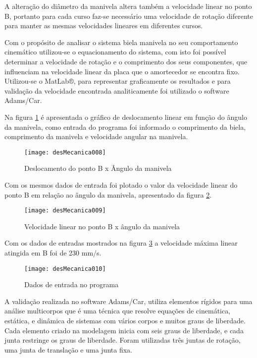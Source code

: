 		A alteração do diâmetro da manivela altera também a velocidade linear no ponto B, portanto para cada curso faz-se necessário uma velocidade de rotação diferente para manter as mesmas velocidades lineares em diferentes cursos.  

		Com o propósito de analisar o sistema biela manivela no seu comportamento cinemático utilizou-se o equacionamento do sistema, com isto foi possível determinar a velocidade de rotação e o comprimento dos seus componentes, que influenciam na velocidade linear da placa que o amortecedor se encontra fixo. Utilizou-se o MatLab®, para representar graficamente os resultados e para validação da velocidade encontrada analiticamente foi utilizado o software Adams/Car.

		Na figura \ref{desMecanica008} é apresentada o gráfico de deslocamento linear em função do ângulo da manivela, como entrada do programa foi informado o comprimento da biela, comprimento da manivela e velocidade angular na manivela.

		\begin{figure}[h]
			\centering
			\texttt{[image: desMecanica008]}
			\caption{Deslocamento do ponto B x Ângulo da manivela}
			\label{desMecanica008}
		\end{figure}

		Com os mesmos dados de entrada foi plotado o valor da velocidade linear do ponto B em relação ao ângulo da manivela, apresentado da figura \ref{desMecanica009}.

		\begin{figure}[h]
			\centering
			\texttt{[image: desMecanica009]}
			\caption{Velocidade linear no ponto B x ângulo da manivela}
			\label{desMecanica009}
		\end{figure}

		Com os dados de entradas mostrados na figura \ref{desMecanica010} a velocidade máxima linear atingida em B foi de 230 mm/s.

		\begin{figure}[h]
			\centering
			\texttt{[image: desMecanica010]}
			\caption{Dados de entrada no programa}
			\label{desMecanica010}
		\end{figure}

		A validação realizada no software Adams/Car, utiliza elementos rígidos para uma análise multicorpos que é uma técnica que resolve equações de cinemática, estática, e dinâmica de sistemas com vários corpos e muitos graus de liberdade. Cada elemento criado na modelagem inicia com seis graus de liberdade, e cada junta restringe os graus de liberdade. Foram utilizadas três juntas de rotação, uma junta de translação e uma junta fixa.

